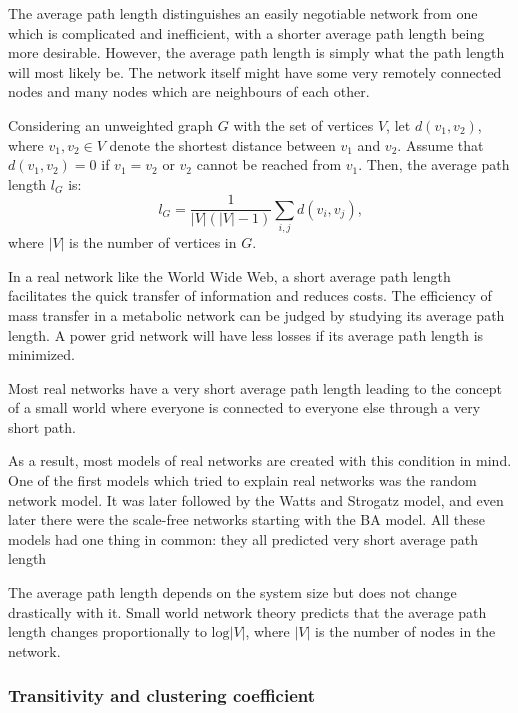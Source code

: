       The average path length distinguishes an easily negotiable network from one which is complicated and inefficient, with a shorter average path length being more desirable. However, the average path length is simply what the path length will most likely be. The network itself might have some very remotely connected nodes and many nodes which are neighbours of each other.
      
      Considering an unweighted graph $G$ with the set of vertices $V$, let $d(v_1, v_2)$, where $v_1, v_2 \in V$ denote the shortest distance between $v_1$ and $v_2$. Assume that $d(v_1, v_2) = 0$ if $v_1 = v_2$ or $v_2$ cannot be reached from $v_1$. Then, the average path length $l_G$ is:
      \begin{equation}
        l_G = \frac{1}{|V| (|V| - 1)} \sum_{i, j} d(v_i, v_j) \mbox{,}
      \end{equation}
      where $|V|$ is the number of vertices in $G$.
      
      In a real network like the World Wide Web, a short average path length facilitates the quick transfer of information and reduces costs. The efficiency of mass transfer in a metabolic network can be judged by studying its average path length. A power grid network will have less losses if its average path length is minimized.

      Most real networks have a very short average path length leading to the concept of a small world where everyone is connected to everyone else through a very short path.

      As a result, most models of real networks are created with this condition in mind. One of the first models which tried to explain real networks was the random network model. It was later followed by the Watts and Strogatz model, and even later there were the scale-free networks starting with the BA model. All these models had one thing in common: they all predicted very short average path length\cite{BarabasiAlbert2002}

      The average path length depends on the system size but does not change drastically with it. Small world network theory predicts that the average path length changes proportionally to $\mbox{log} |V|$, where $|V|$ is the number of nodes in the network.
      
    \subsubsection{Transitivity and clustering coefficient}
    
